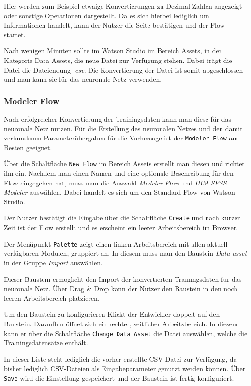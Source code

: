 Hier werden zum Beispiel etwaige Konvertierungen zu Dezimal-Zahlen angezeigt oder sonstige Operationen dargestellt. Da
es sich hierbei lediglich um Informationen handelt, kann der Nutzer die Seite bestätigen und der Flow startet.

Nach wenigen Minuten sollte im Watson Studio im Bereich Assets, in der Kategorie Data Assets, die neue Datei zur
Verfügung stehen. Dabei trägt die Datei die Dateiendung \textit{.csv}. Die Konvertierung der Datei ist somit
abgeschlossen und man kann sie für das neuronale Netz verwenden.

\subsubsection{Modeler Flow}
\label{subsub:modeler_flow}
Nach erfolgreicher Konvertierung der Trainingsdaten kann man diese für das neuronale Netz nutzen. Für die Erstellung
des neuronalen Netzes und den damit verbundenen Parameterübergaben für die Vorhersage ist der \texttt{Modeler Flow} am
Besten geeignet.

Über die Schaltfläche \texttt{New Flow} im Bereich Assets erstellt man diesen und richtet ihn ein. Nachdem man einen Namen
und eine optionale Beschreibung für den Flow eingegeben hat, muss man die Auswahl \textit{Modeler Flow} und
\textit{IBM SPSS Modeler} auswählen. Dabei handelt es sich um den Standard-Flow von Watson Studio.

Der Nutzer bestätigt die Eingabe über die Schaltfläche \texttt{Create} und nach kurzer Zeit ist der Flow erstellt und es
erscheint ein leerer Arbeitsbereich im Browser.

Der Menüpunkt \texttt{Palette} zeigt einen linken Arbeitsbereich mit allen aktuell verfügbaren Modulen, gruppiert an. In
diesem muss man den Baustein \textit{Data asset} in der Gruppe \textit{Import} auswählen.

Dieser Baustein ermöglicht den Import der konvertierten Trainingsdaten für das neuronale Netz. Über Drag \& Drop kann der
Nutzer den Baustein in den noch leeren Arbeitsbereich platzieren.

Um den Baustein zu konfigurieren Klickt der Entwickler doppelt auf den Baustein. Daraufhin öffnet sich ein rechter,
seitlicher Arbeitsbereich. In diesem kann er über die Schaltfläche \texttt{Change Data Asset} die Datei auswählen, welche
die Trainingsdatensätze enthält.

In dieser Liste steht lediglich die vorher erstellte CSV-Datei zur Verfügung, da bisher lediglich CSV-Dateien als
Eingabeparameter genutzt werden können. Über \texttt{Save} wird die Einstellung gespeichert und der Baustein ist fertig
konfiguriert.

